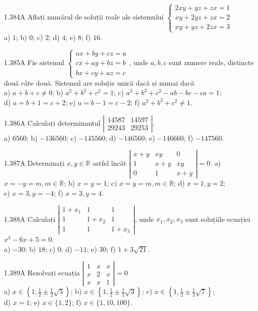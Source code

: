\documentclass[11pt]{article}
\begin{document}
1.384A Aflați numărul de soluții reale ale sistemului $\left\{\begin{array}{l}2 x y+y z+z x=1 \\ x y+2 y z+z x=2 \\ x y+y z+2 z x=3\end{array}\right.$\\ a) $1$; b) $0$; c) $2$; d) $4$; e) $8$; f) $16$.

1.385A Fie sistemul $\left\{\begin{array}{l}a x+b y+c z=a \\ c x+a y+b z=b \\ b x+c y+a z=c\end{array}\right.$, unde $a, b, c$ sunt numere reale, distincte două câte două. Sistemul are soluție unică dacă și numai dacă\\ a) $a+b+c \neq 0$; b) $a^{2}+b^{2}+c^{2}=1$; c) $a^{2}+b^{2}+c^{2}-a b-b c-c a=1$;\\ d) $a=b+1=c+2$; e) $a=b-1=c-2$; f) $a^{2}+b^{2}+c^{2} \neq 1$.

1.386A Calculați determinantul $\left|\begin{array}{ll}14587 & 14597 \\ 29243 & 29253\end{array}\right|$.\\ a) $6560$; b) $-136560$; c) $-145560$; d) $-146560$; e) $-146660$; f) $-147560$.

1.387A Determinați $x, y \in \mathbb{R}$ astfel încât $\left|\begin{array}{ccc}x+y & x y & 0 \\ 1 & x+y & x y \\ 0 & 1 & x+y\end{array}\right|=0$. a) $x=-y=m, m \in \mathbb{R}$; b) $x=y=1$; c) $x=y=m, m \in \mathbb{R}$; d) $x=1, y=2$;\\ e) $x=3, y=-4$; f) $x=3, y=4$.

1.388A Calculați $\left|\begin{array}{ccc}1+x_{1} & 1 & 1 \\ 1 & 1+x_{2} & 1 \\ 1 & 1 & 1+x_{3}\end{array}\right|$, unde $x_{1}, x_{2}, x_{3}$ sunt soluțiile ecuației $x^{3}-6 x+5=0$.\\ a) $-30$; b) $18$; c) $0$; d) $-11$; e) $30$; f) $1+3 \sqrt{21}$.

1.389A Rezolvați ecuația $\left|\begin{array}{lll}1 & x & x \\ x & 2 & x \\ x & x & 1\end{array}\right|=0$\\ a) $x \in\left\{1, \frac{1}{2} \pm \frac{1}{2} \sqrt{5}\right\}$; b) $x \in\left\{1, \frac{1}{2} \pm \frac{1}{2} \sqrt{3}\right\}$; c) $x \in\left\{1, \frac{1}{2} \pm \frac{1}{2} \sqrt{7}\right\}$;\\ d) $x=1$; e) $x \in\{1,2\}$; f) $x \in\{1,10,100\}$.
\end{document}
